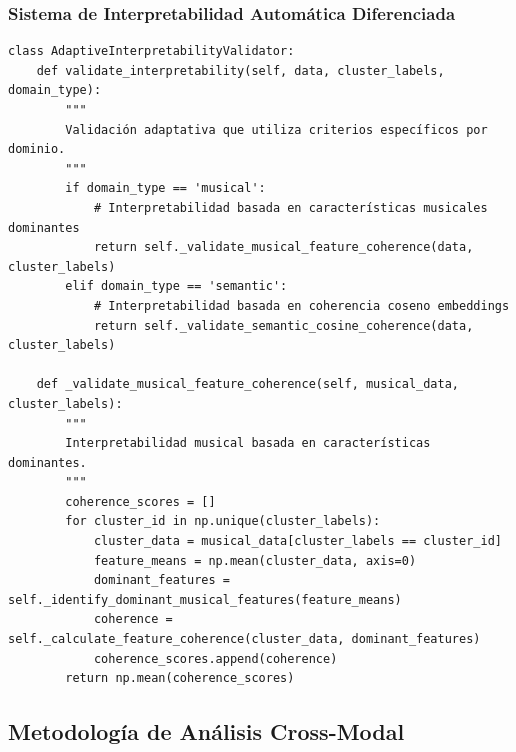 \documentclass[12pt,a4paper]{article}
\begin{document}
\subsubsection{Sistema de Interpretabilidad Automática Diferenciada}

\begin{lstlisting}[caption={Validación Automática de Interpretabilidad Adaptativa}]
class AdaptiveInterpretabilityValidator:
    def validate_interpretability(self, data, cluster_labels, domain_type):
        """
        Validación adaptativa que utiliza criterios específicos por dominio.
        """
        if domain_type == 'musical':
            # Interpretabilidad basada en características musicales dominantes
            return self._validate_musical_feature_coherence(data, cluster_labels)
        elif domain_type == 'semantic':
            # Interpretabilidad basada en coherencia coseno embeddings
            return self._validate_semantic_cosine_coherence(data, cluster_labels)

    def _validate_musical_feature_coherence(self, musical_data, cluster_labels):
        """
        Interpretabilidad musical basada en características dominantes.
        """
        coherence_scores = []
        for cluster_id in np.unique(cluster_labels):
            cluster_data = musical_data[cluster_labels == cluster_id]
            feature_means = np.mean(cluster_data, axis=0)
            dominant_features = self._identify_dominant_musical_features(feature_means)
            coherence = self._calculate_feature_coherence(cluster_data, dominant_features)
            coherence_scores.append(coherence)
        return np.mean(coherence_scores)
\end{lstlisting}

\subsection{Metodología de Análisis Cross-Modal}
\end{document}

